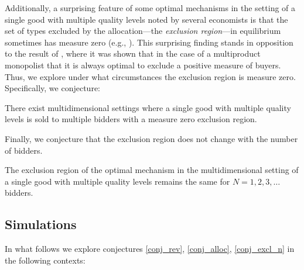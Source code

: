 Additionally, a surprising feature of some optimal mechanisms in the setting of a single good with multiple quality levels noted by several economists is that the set of types excluded by the allocation---the \textit{exclusion region}---in equilibrium sometimes has measure zero (e.g., \cite{thirumulanathan2019, belloni2010multidimensional}). This surprising finding stands in opposition to the result of \autocite{armstrong1996multiproduct}, where it was shown that in the case of a multiproduct monopolist that it is always optimal to exclude a positive measure of buyers. Thus, we explore under what circumstances the exclusion region is measure zero. Specifically, we conjecture:

\begin{conjecture}\label{conj_excl_zero}
There exist multidimensional settings where a single good with multiple quality levels is sold to multiple bidders with a measure zero exclusion region.
\end{conjecture}

Finally, we conjecture that the exclusion region does not change with the number of bidders.

\begin{conjecture}\label{conj_excl_n}
The exclusion region of the optimal mechanism in the multidimensional setting of a single good with multiple quality levels remains the same for $N=1,2,3,\dots$ bidders. 
\end{conjecture}









\subsection{Simulations}\label{subsec_sim}

In what follows we explore conjectures \ref{conj_rev}, \ref{conj_alloc}, \ref{conj_excl_n} in the following contexts:

